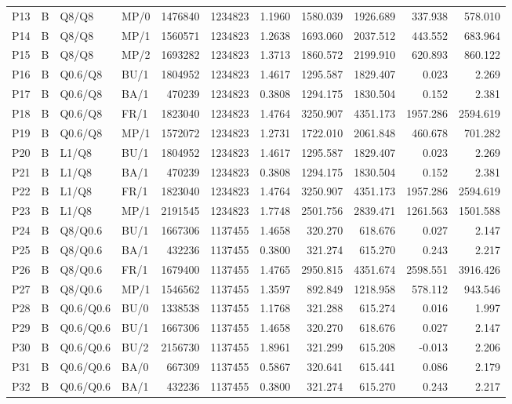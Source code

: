 \begin{longtable}{llllrrrrrrr}
P13 & B & Q8/Q8 & MP/0 & 1476840 & 1234823 & 1.1960 & 1580.039 & 1926.689 & 337.938 & 578.010\\
P14 & B & Q8/Q8 & MP/1 & 1560571 & 1234823 & 1.2638 & 1693.060 & 2037.512 & 443.552 & 683.964\\
P15 & B & Q8/Q8 & MP/2 & 1693282 & 1234823 & 1.3713 & 1860.572 & 2199.910 & 620.893 & 860.122\\
P16 & B & Q0.6/Q8 & BU/1 & 1804952 & 1234823 & 1.4617 & 1295.587 & 1829.407 & 0.023 & 2.269\\
P17 & B & Q0.6/Q8 & BA/1 & 470239 & 1234823 & 0.3808 & 1294.175 & 1830.504 & 0.152 & 2.381\\
P18 & B & Q0.6/Q8 & FR/1 & 1823040 & 1234823 & 1.4764 & 3250.907 & 4351.173 & 1957.286 & 2594.619\\
P19 & B & Q0.6/Q8 & MP/1 & 1572072 & 1234823 & 1.2731 & 1722.010 & 2061.848 & 460.678 & 701.282\\
P20 & B & L1/Q8 & BU/1 & 1804952 & 1234823 & 1.4617 & 1295.587 & 1829.407 & 0.023 & 2.269\\
P21 & B & L1/Q8 & BA/1 & 470239 & 1234823 & 0.3808 & 1294.175 & 1830.504 & 0.152 & 2.381\\
P22 & B & L1/Q8 & FR/1 & 1823040 & 1234823 & 1.4764 & 3250.907 & 4351.173 & 1957.286 & 2594.619\\
P23 & B & L1/Q8 & MP/1 & 2191545 & 1234823 & 1.7748 & 2501.756 & 2839.471 & 1261.563 & 1501.588\\
P24 & B & Q8/Q0.6 & BU/1 & 1667306 & 1137455 & 1.4658 & 320.270 & 618.676 & 0.027 & 2.147\\
P25 & B & Q8/Q0.6 & BA/1 & 432236 & 1137455 & 0.3800 & 321.274 & 615.270 & 0.243 & 2.217\\
P26 & B & Q8/Q0.6 & FR/1 & 1679400 & 1137455 & 1.4765 & 2950.815 & 4351.674 & 2598.551 & 3916.426\\
P27 & B & Q8/Q0.6 & MP/1 & 1546562 & 1137455 & 1.3597 & 892.849 & 1218.958 & 578.112 & 943.546\\
P28 & B & Q0.6/Q0.6 & BU/0 & 1338538 & 1137455 & 1.1768 & 321.288 & 615.274 & 0.016 & 1.997\\
P29 & B & Q0.6/Q0.6 & BU/1 & 1667306 & 1137455 & 1.4658 & 320.270 & 618.676 & 0.027 & 2.147\\
P30 & B & Q0.6/Q0.6 & BU/2 & 2156730 & 1137455 & 1.8961 & 321.299 & 615.208 & -0.013 & 2.206\\
P31 & B & Q0.6/Q0.6 & BA/0 & 667309 & 1137455 & 0.5867 & 320.641 & 615.441 & 0.086 & 2.179\\
P32 & B & Q0.6/Q0.6 & BA/1 & 432236 & 1137455 & 0.3800 & 321.274 & 615.270 & 0.243 & 2.217\\

\end{longtable}
